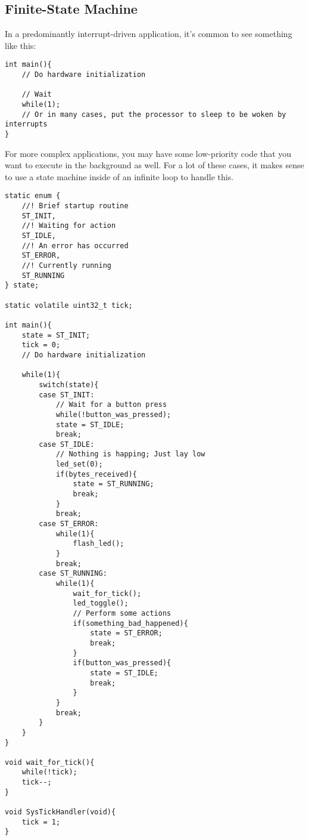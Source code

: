\documentclass[10pt]{article}
\begin{document}
\subsection{Finite-State Machine}
In a predominantly interrupt-driven application, it's common to see something like this:
\begin{lstlisting}[label=lst-interrupt-driven,caption=Interrupt driven system]
int main(){
	// Do hardware initialization
	
	// Wait
	while(1);
	// Or in many cases, put the processor to sleep to be woken by interrupts
}
\end{lstlisting}
For more complex applications, you may have some low-priority code that you want to execute in the background as well. For a lot of these cases, it makes sense to use a state machine inside of an infinite loop to handle this.

\begin{lstlisting}[label=lst-fsm,caption=Finite-state machine]
static enum {
	//! Brief startup routine
	ST_INIT,
	//! Waiting for action
	ST_IDLE,
	//! An error has occurred
	ST_ERROR,
	//! Currently running
	ST_RUNNING
} state;

static volatile uint32_t tick;

int main(){
	state = ST_INIT;
	tick = 0;
	// Do hardware initialization
	
	while(1){
		switch(state){
		case ST_INIT:
			// Wait for a button press
			while(!button_was_pressed);
			state = ST_IDLE;
			break;
		case ST_IDLE:
			// Nothing is happing; Just lay low
			led_set(0);
			if(bytes_received){
				state = ST_RUNNING;
				break;
			}
			break;
		case ST_ERROR:
			while(1){
				flash_led();
			}
			break;
		case ST_RUNNING:
			while(1){
				wait_for_tick();
				led_toggle();
				// Perform some actions
				if(something_bad_happened){
					state = ST_ERROR;
					break;
				}
				if(button_was_pressed){
					state = ST_IDLE;
					break;
				}
			}
			break;
		}
	}
}

void wait_for_tick(){
	while(!tick);
	tick--;
}

void SysTickHandler(void){
	tick = 1;
}

\end{lstlisting}
\end{document}
